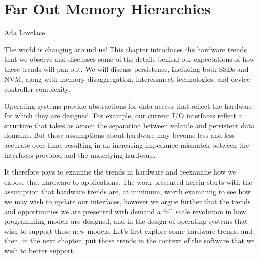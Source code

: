 \chapter{Far Out Memory Hierarchies}\label{ch:farout}

{Ada Lovelace}

\begin{chabstract}
    The world is changing around us!
    This chapter introduces the hardware trends that we observe and discusses some of the details behind our expectations of how these trends will pan out. We will discuss persistence,
    including both SSDs and NVM, along with memory disaggregation, interconnect technologies, and device controller complexity.
\end{chabstract}

Operating systems provide abstractions for data access that reflect the hardware for which they are designed. For example, our current I/O interfaces reflect a structure that takes as axiom
the separation between volatile and persistent data domains. But those assumptions about hardware may become less and less accurate over time, resulting in an increasing impedance mismatch
between the interfaces provided and the underlying hardware.



It therefore pays to examine the trends in hardware and reexamine how we expose that hardware to applications. The work presented
herein starts with the assumption that hardware trends are, at minimum, worth examining to see how we may wish to update our interfaces, however we argue further that the trends and
opportunities we are presented with demand a full scale revolution in how programming models are designed, and in the design of operating systems that wish to support these new models. Let's
first explore some hardware trends, and then, in the next chapter, put those trends in the context of the software that we wish to better support.



